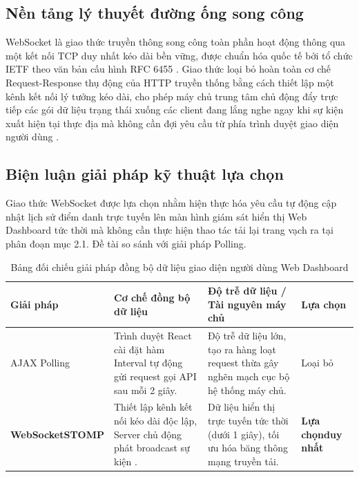 \documentclass[../DoAn.tex]{subfiles}
\begin{document}
\subsection{Nền tảng lý thuyết đường ống song công}

WebSocket là giao thức truyền thông song công toàn phần hoạt động thông qua một kết nối TCP duy nhất kéo dài bền vững, được chuẩn hóa quốc tế bởi tổ chức IETF theo văn bản cấu hình RFC 6455 \cite{rfc6455}. Giao thức loại bỏ hoàn toàn cơ chế Request-Response thụ động của HTTP truyền thống bằng cách thiết lập một kênh kết nối lý tưởng kéo dài, cho phép máy chủ trung tâm chủ động đẩy trực tiếp các gói dữ liệu trạng thái xuống các client đang lắng nghe ngay khi sự kiện xuất hiện tại thực địa mà không cần đợi yêu cầu từ phía trình duyệt giao diện người dùng \cite{rfc6455}.

\subsection{Biện luận giải pháp kỹ thuật lựa chọn}

Giao thức WebSocket được lựa chọn nhằm hiện thực hóa yêu cầu tự động cập nhật lịch sử điểm danh trực tuyến lên màn hình giám sát hiển thị Web Dashboard tức thời mà không cần thực hiện thao tác tải lại trang vạch ra tại phân đoạn mục 2.1. Đề tài so sánh với giải pháp Polling.

\begin{table}[ht!]
\centering
\small
\renewcommand{\arraystretch}{1.3}
\caption{Bảng đối chiếu giải pháp đồng bộ dữ liệu giao diện người dùng Web Dashboard}
\label{tab:websocket_comparison}
\begin{tabular}{|>{\raggedright\arraybackslash}p{2.3cm}|>{\raggedright\arraybackslash}p{4.5cm}|>{\raggedright\arraybackslash}p{5.5cm}|>{\centering\arraybackslash}p{1.7cm}|}
\hline
\textbf{Giải pháp} & \textbf{Cơ chế đồng bộ dữ liệu} & \textbf{Độ trễ dữ liệu / Tài nguyên máy chủ} & \textbf{Lựa chọn} \\ \hline
AJAX Polling & Trình duyệt React cài đặt hàm Interval tự động gửi request gọi API sau mỗi 2 giây. & Độ trễ dữ liệu lớn, tạo ra hàng loạt request thừa gây nghẽn mạch cục bộ hệ thống máy chủ. & Loại bỏ \\ \hline
\textbf{WebSocket\newline STOMP} & Thiết lập kênh kết nối kéo dài độc lập, Server chủ động phát broadcast sự kiện \cite{rfc6455}. & Dữ liệu hiển thị trực tuyến tức thời (dưới 1 giây), tối ưu hóa băng thông mạng truyền tải. & \textbf{Lựa chọn\newline duy nhất} \\ \hline
\end{tabular}
\end{table}
\end{document}
